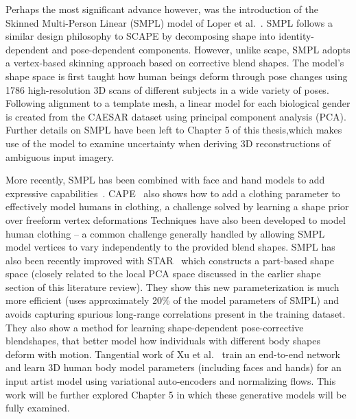 Perhaps the most significant advance however, was the introduction of the Skinned Multi-Person Linear (SMPL) model of Loper et al.~\cite{loper15smpl}. SMPL follows a similar design philosophy to SCAPE by decomposing shape into identity-dependent and pose-dependent components. However, unlike scape, SMPL adopts a vertex-based skinning approach based on corrective blend shapes. The model's shape space is first taught how human beings deform through pose changes using 1786 high-resolution 3D scans of different subjects in a wide variety of poses. Following alignment to a template mesh, a linear model for each biological gender is created from the CAESAR dataset \cite{robinette2002civilian} using principal component analysis (PCA). Further details on SMPL have been left to Chapter 5 of this thesis,which makes use of the model to examine uncertainty when deriving 3D reconstructions of ambiguous input imagery.


More recently, SMPL has been combined with face and hand models to add expressive capabilities~\cite{xiang19monocular, joo18total, pavlakos19expressive}. CAPE~\cite{CAPE:CVPR:20} also shows how to add a clothing parameter to effectively model humans in clothing, a challenge solved by learning a shape prior over freeform vertex deformations Techniques have also been developed to model human clothing -- a common challenge generally handled by allowing SMPL model vertices to vary independently to the provided blend shapes. SMPL has also been recently improved with STAR~\cite{STAR:2020} which constructs a part-based shape space (closely related to the local PCA space discussed in the earlier shape section of this literature review). They show this new parameterization is much more efficient (uses approximately 20\% of the model parameters of SMPL) and avoids capturing spurious long-range correlations present in the training dataset. They also show a method for learning shape-dependent pose-corrective blendshapes, that better model how individuals with different body shapes deform with motion. Tangential work of Xu et al.~\cite{ghum-ghuml} train an end-to-end network and learn 3D human body model parameters (including faces and hands) for an input artist model using variational auto-encoders and normalizing flows. This work will be further explored Chapter 5 in which these generative models will be fully examined. 

